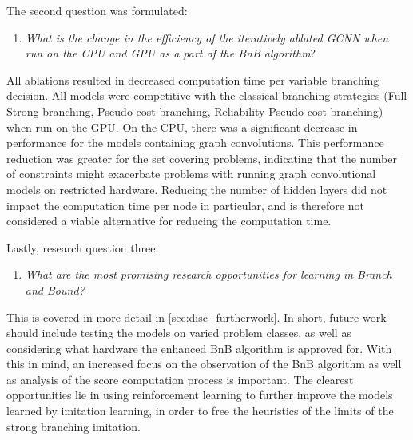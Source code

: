 The second question was formulated:
%
\begin{enumerate}[resume*]
    \item \textit{What is the change in the efficiency of the iteratively ablated \gls{GCNN} when run on the \gls{CPU} and \gls{GPU} as a part of the \gls{BnB} algorithm}?
\end{enumerate}
%
All ablations resulted in decreased computation time per variable branching decision. All models were competitive with the classical branching strategies (Full Strong branching, Pseudo-cost branching, Reliability Pseudo-cost branching) when run on the \gls{GPU}. On the \gls{CPU}, there was a significant decrease in performance for the models containing graph convolutions. This performance reduction was greater for the set covering problems, indicating that the number of constraints might exacerbate problems with running graph convolutional models on restricted hardware. Reducing the number of hidden layers did not impact the computation time per node in particular, and is therefore not considered a viable alternative for reducing the computation time.    

Lastly, research question three:
%
\begin{enumerate}[resume*]
    \item \textit{What are the most promising research opportunities for learning in Branch and Bound?}
\end{enumerate}
%
This is covered in more detail in \cref{sec:disc_furtherwork}. In short, future work should include testing the models on varied problem classes, as well as considering what hardware the enhanced \gls{BnB} algorithm is approved for. With this in mind, an increased focus on the observation of the \gls{BnB} algorithm as well as analysis of the score computation process is important. The clearest opportunities lie in using reinforcement learning to further improve the models learned by imitation learning, in order to free the heuristics of the limits of the strong branching imitation. 
